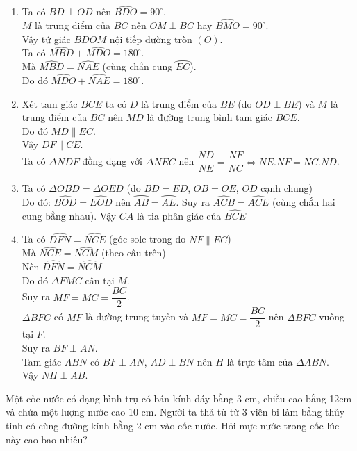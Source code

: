 \begin{ex}
{\begin{enumerate}
\item Ta có $BD \perp OD$ nên $\widehat{BDO}=90^{\circ}$.\\
$M$ là trung điểm của $BC$ nên $OM \perp BC$ hay $\widehat{BMO}=90^\circ$.\\
Vậy tứ giác $BDOM$ nội tiếp đường tròn $(O)$.\\
Ta có $\widehat{MBD}+\widehat{MDO}=180^\circ$.\\
Mà $\widehat{MBD}=\widehat{NAE}$ (cùng chắn cung $\wideparen{EC}$).\\
Do đó  $\widehat{MDO}+\widehat{NAE}=180^\circ$.
\item Xét tam giác $BCE$ ta có $D$ là trung điểm của $BE$ (do $OD \perp BE$) và $M$ là trung điểm của $BC$ nên $MD$ là đường trung bình tam giác $BCE$.\\
Do đó $MD \parallel EC$.\\
Vậy $DF \parallel CE$.\\
Ta có $\Delta NDF$ đồng dạng với $\Delta NEC$ nên $\dfrac{ND}{NE}=\dfrac{NF}{NC}\Leftrightarrow NE.NF=NC.ND$.
\item Ta có $\Delta OBD =\Delta OED$ (do $BD=ED$, $OB=OE$, $OD$ cạnh chung)\\
Do đó: $\widehat{BOD}=\widehat{EOD}$ nên $\wideparen{AB}=\wideparen{AE}$. Suy ra $\widehat{ACB}=\widehat{ACE}$ (cùng chắn hai cung bằng nhau). Vậy $CA$ là tia phân giác của $\widehat{BCE}$
\item Ta có $\widehat{DFN}=\widehat{NCE}$ (góc sole trong do $NF \parallel EC$)\\
Mà $\widehat{NCE}=\widehat{NCM}$ (theo câu trên)\\
Nên $\widehat{DFN}=\widehat{NCM}$\\
Do đó $\Delta FMC$ cân tại $M$.\\
Suy ra $MF=MC=\dfrac{BC}{2}$.\\
$\Delta BFC$ có $MF$ là đường trung tuyến và $MF=MC=\dfrac{BC}{2}$ nên $\Delta BFC$ vuông tại $F$.\\
Suy ra $BF \perp AN$.\\
Tam giác $ABN$ có $BF \perp AN$, $AD \perp BN$ nên $H$ là trực tâm của $\Delta ABN$.\\
Vậy $NH \perp AB$.
\end{enumerate}
}
\end{ex}

\begin{ex}%
Một cốc nước có dạng hình trụ có bán kính đáy bằng 3 cm, chiều cao bằng 12cm và chứa một lượng nước cao 10 cm. Người ta thả từ từ 3 viên bi làm bằng thủy tinh có cùng đường kính bằng 2 cm vào cốc nước. Hỏi mực nước trong cốc lúc này cao bao nhiêu?
\end{ex}
